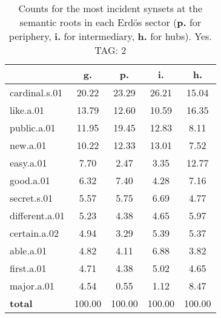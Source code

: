 \begin{table}[h!]
\begin{center}
\begin{tabular}{| l | c | c | c | c |}\hline
 & g. & p. & i. & h. \\\hline
cardinal.s.01 & 20.22  & 23.29  & 26.21  & 15.04 \\\hline
like.a.01 & 13.79  & 12.60  & 10.59  & 16.35 \\\hline
public.a.01 & 11.95  & 19.45  & 12.83  & 8.11 \\\hline
new.a.01 & 10.22  & 12.33  & 13.01  & 7.52 \\\hline
easy.a.01 & 7.70  & 2.47  & 3.35  & 12.77 \\\hline
good.a.01 & 6.32  & 7.40  & 4.28  & 7.16 \\\hline
secret.s.01 & 5.57  & 5.75  & 6.69  & 4.77 \\\hline
different.a.01 & 5.23  & 4.38  & 4.65  & 5.97 \\\hline
certain.a.02 & 4.94  & 3.29  & 5.39  & 5.37 \\\hline
able.a.01 & 4.82  & 4.11  & 6.88  & 3.82 \\\hline
first.a.01 & 4.71  & 4.38  & 5.02  & 4.65 \\\hline
major.a.01 & 4.54  & 0.55  & 1.12  & 8.47 \\\hline
{{\bf total}} & 100.00  & 100.00  & 100.00  & 100.00 \\\hline
\end{tabular}
\caption{Counts for the most incident synsets at the semantic roots in each Erd\"os sector ({\bf p.} for periphery, {\bf i.} for intermediary, {\bf h.} for hubs). Yes. TAG: 2}
\end{center}
\end{table}